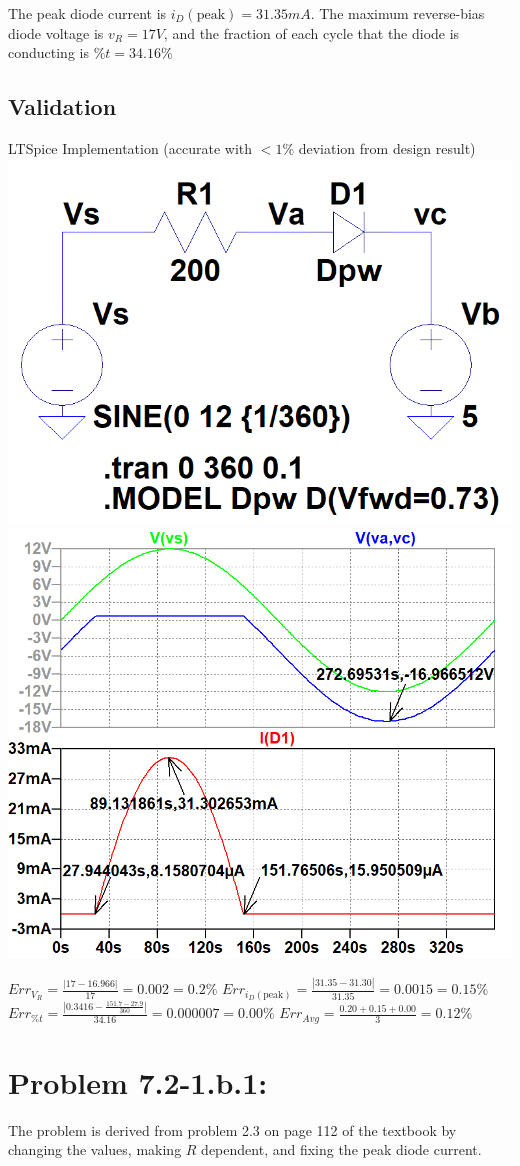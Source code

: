 \documentclass[12pt,letterpaper,titlepage]{article}
\begin{document}
\begin{raggedright}
The peak diode current is $i_D(\text{peak}) = 31.35mA$. 
 The maximum reverse-bias diode voltage is $v_R = 17V$, 
 and the fraction of each cycle that the diode is conducting is $\%t = 34.16\%$

\subsection{Validation}

\begin{center}
LTSpice Implementation (accurate with $< 1\%$ deviation from design result)
\includegraphics[width=.39\textwidth, height=\textheight, keepaspectratio=true]{ds1b}
\includegraphics[width=.6\textwidth, height=\textheight, keepaspectratio=true]{ds1c}
\begin{paracol}{2}
$Err_{V_R} = \frac{|17-16.966|}{17} = 0.002 = 0.2\%$
\switchcolumn
$Err_{i_D(\text{peak})} = \frac{|31.35-31.30|}{31.35} = 0.0015 = 0.15\%$
\switchcolumn
$Err_{\%t} = \frac{|0.3416-\frac{151.7-27.9}{360}|}{34.16} = 0.000007 = 0.00\%$
\switchcolumn
$Err_{Avg} = \frac{0.20 + 0.15 + 0.00}{3} = 0.12\%$
\end{paracol}
\end{center}

\clearpage
\section{Problem 7.2-1.b.1: } The problem is derived from problem 2.3 on page 112 of the textbook by changing the values, making $R$ dependent, and fixing the peak diode current. 

\end{raggedright}
\end{document}
